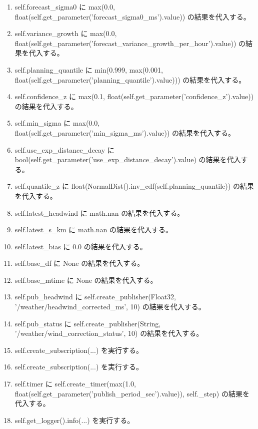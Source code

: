 \documentclass[a4paper,11pt]{article}
\begin{document}
\begin{enumerate}[leftmargin=1.8em]
\item self.forecast\_sigma0 に max(0.0, float(self.get\_parameter('forecast\_sigma0\_ms').value)) の結果を代入する。
\item self.variance\_growth に max(0.0, float(self.get\_parameter('forecast\_variance\_growth\_per\_hour').value)) の結果を代入する。
\item self.planning\_quantile に min(0.999, max(0.001, float(self.get\_parameter('planning\_quantile').value))) の結果を代入する。
\item self.confidence\_z に max(0.1, float(self.get\_parameter('confidence\_z').value)) の結果を代入する。
\item self.min\_sigma に max(0.0, float(self.get\_parameter('min\_sigma\_ms').value)) の結果を代入する。
\item self.use\_exp\_distance\_decay に bool(self.get\_parameter('use\_exp\_distance\_decay').value) の結果を代入する。
\item self.quantile\_z に float(NormalDist().inv\_cdf(self.planning\_quantile)) の結果を代入する。
\item self.latest\_headwind に math.nan の結果を代入する。
\item self.latest\_s\_km に math.nan の結果を代入する。
\item self.latest\_bias に 0.0 の結果を代入する。
\item self.base\_df に None の結果を代入する。
\item self.base\_mtime に None の結果を代入する。
\item self.pub\_headwind に self.create\_publisher(Float32, '/weather/headwind\_corrected\_ms', 10) の結果を代入する。
\item self.pub\_status に self.create\_publisher(String, '/weather/wind\_correction\_status', 10) の結果を代入する。
\item self.create\_subscription(...) を実行する。
\item self.create\_subscription(...) を実行する。
\item self.timer に self.create\_timer(max(1.0, float(self.get\_parameter('publish\_period\_sec').value)), self.\_step) の結果を代入する。
\item self.get\_logger().info(...) を実行する。
            \end{enumerate}
\end{document}
